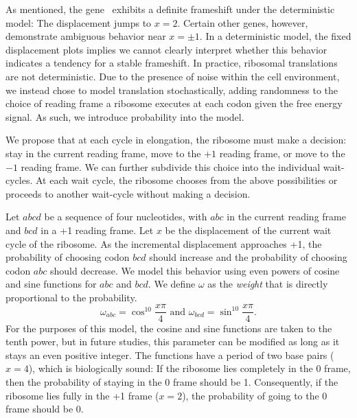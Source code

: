 \documentclass[12pt, draft]{article}
\numberwithin{equation}{section}
\begin{document}
As mentioned, the gene \prfB\ exhibits a definite frameshift under the deterministic model: The displacement jumps to $x=2$.
Certain other genes, however, demonstrate ambiguous behavior near $x = \pm 1$.
In a deterministic model, the fixed displacement plots implies
we cannot clearly interpret whether this behavior indicates a tendency for a stable frameshift.
In practice, ribosomal translations are not deterministic. Due to the presence of
noise within the cell environment, we instead chose to model translation stochastically, adding
randomness to the choice of reading frame a ribosome executes at each codon given the free energy signal.
As such, we introduce probability into the model.

We propose that at each cycle in elongation, the ribosome must make a decision: stay in the current reading frame,
move to the $+1$ reading frame,
or move to the $-1$ reading frame.  We can further subdivide this choice into the individual wait-cycles.
At each wait cycle, the ribosome chooses from the above possibilities or proceeds to another wait-cycle without making a decision.

Let $abcd$ be a sequence of four nucleotides, with $abc$ in the
current reading frame and $bcd$ in a +1 reading frame.  Let $x$ be the
displacement of the current wait cycle of the ribosome.  As the
incremental displacement approaches +1, the probability of choosing
codon $bcd$ should increase and the probability of choosing codon
$abc$ should decrease.  We model this behavior using even powers of
cosine and sine functions for $abc$ and $bcd$.  We
define $\omega$ as the \emph{weight} that is directly proportional to
the probability.
\begin{equation}
  \omega_{abc} = \cos^{10}{\frac{x\pi}{4}} \text{ and } \omega_{bcd} = \sin^{10}{\frac{x\pi}{4}}.
\end{equation}
For the purposes of this model, the cosine and sine functions are taken to the tenth power, but
in future studies, this parameter can be modified as long as it stays an even positive integer.
The functions have a period of two base pairs ($x=4$), which is biologically sound:
If the ribosome lies completely in the 0 frame, then the probability of staying in the 0 frame should be 1.  
Consequently, if the ribosome lies fully in the +1 frame ($x=2$), the probability of going to
the 0 frame should be 0.

\end{document}
